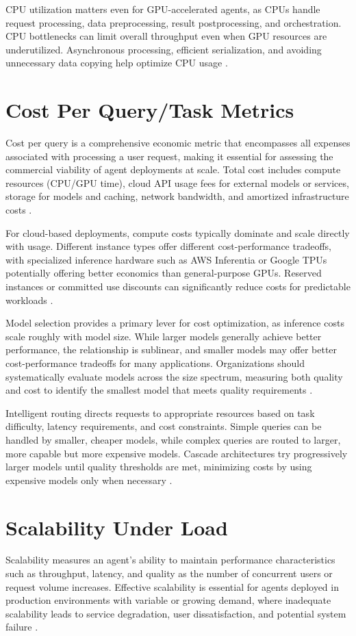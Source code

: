 \begin{TNtwocol}
CPU utilization matters even for GPU-accelerated agents, as CPUs handle request processing, data preprocessing, result postprocessing, and orchestration. CPU bottlenecks can limit overall throughput even when GPU resources are underutilized. Asynchronous processing, efficient serialization, and avoiding unnecessary data copying help optimize CPU usage \cite{huggingface2024}.

\section{Cost Per Query/Task Metrics}
Cost per query is a comprehensive economic metric that encompasses all expenses associated with processing a user request, making it essential for assessing the commercial viability of agent deployments at scale. Total cost includes compute resources (CPU/GPU time), cloud API usage fees for external models or services, storage for models and caching, network bandwidth, and amortized infrastructure costs \cite{wandb2024,langchain2024}.

For cloud-based deployments, compute costs typically dominate and scale directly with usage. Different instance types offer different cost-performance tradeoffs, with specialized inference hardware such as AWS Inferentia or Google TPUs potentially offering better economics than general-purpose GPUs. Reserved instances or committed use discounts can significantly reduce costs for predictable workloads \cite{wandb2024}.

Model selection provides a primary lever for cost optimization, as inference costs scale roughly with model size. While larger models generally achieve better performance, the relationship is sublinear, and smaller models may offer better cost-performance tradeoffs for many applications. Organizations should systematically evaluate models across the size spectrum, measuring both quality and cost to identify the smallest model that meets quality requirements \cite{wandb2024,langchain2024}.

Intelligent routing directs requests to appropriate resources based on task difficulty, latency requirements, and cost constraints. Simple queries can be handled by smaller, cheaper models, while complex queries are routed to larger, more capable but more expensive models. Cascade architectures try progressively larger models until quality thresholds are met, minimizing costs by using expensive models only when necessary \cite{wandb2024}.

\section{Scalability Under Load}
Scalability measures an agent's ability to maintain performance characteristics such as throughput, latency, and quality as the number of concurrent users or request volume increases. Effective scalability is essential for agents deployed in production environments with variable or growing demand, where inadequate scalability leads to service degradation, user dissatisfaction, and potential system failure \cite{getmaximai2024,shahrad2020}.


\end{TNtwocol}
